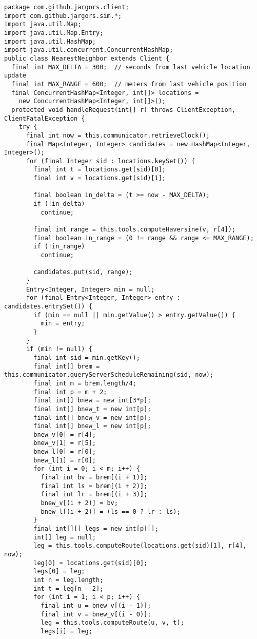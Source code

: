{
\small
\begin{verbatim}
package com.github.jargors.client;
import com.github.jargors.sim.*;
import java.util.Map;
import java.util.Map.Entry;
import java.util.HashMap;
import java.util.concurrent.ConcurrentHashMap;
public class NearestNeighbor extends Client {
  final int MAX_DELTA = 300;  // seconds from last vehicle location update
  final int MAX_RANGE = 600;  // meters from last vehicle position
  final ConcurrentHashMap<Integer, int[]> locations =
    new ConcurrentHashMap<Integer, int[]>();
  protected void handleRequest(int[] r) throws ClientException, ClientFatalException {
    try {
      final int now = this.communicator.retrieveClock();
      final Map<Integer, Integer> candidates = new HashMap<Integer, Integer>();
      for (final Integer sid : locations.keySet()) {
        final int t = locations.get(sid)[0];
        final int v = locations.get(sid)[1];

        final boolean in_delta = (t >= now - MAX_DELTA);
        if (!in_delta)
          continue;

        final int range = this.tools.computeHaversine(v, r[4]);
        final boolean in_range = (0 != range && range <= MAX_RANGE);
        if (!in_range)
          continue;

        candidates.put(sid, range);
      }
      Entry<Integer, Integer> min = null;
      for (final Entry<Integer, Integer> entry : candidates.entrySet()) {
        if (min == null || min.getValue() > entry.getValue()) {
          min = entry;
        }
      }
      if (min != null) {
        final int sid = min.getKey();
        final int[] brem = this.communicator.queryServerScheduleRemaining(sid, now);
        final int m = brem.length/4;
        final int p = m + 2;
        final int[] bnew = new int[3*p];
        final int[] bnew_t = new int[p];
        final int[] bnew_v = new int[p];
        final int[] bnew_l = new int[p];
        bnew_v[0] = r[4];
        bnew_v[1] = r[5];
        bnew_l[0] = r[0];
        bnew_l[1] = r[0];
        for (int i = 0; i < m; i++) {
          final int bv = brem[(i + 1)];
          final int ls = brem[(i + 2)];
          final int lr = brem[(i + 3)];
          bnew_v[(i + 2)] = bv;
          bnew_l[(i + 2)] = (ls == 0 ? lr : ls);
        }
        final int[][] legs = new int[p][];
        int[] leg = null;
        leg = this.tools.computeRoute(locations.get(sid)[1], r[4], now);
        leg[0] = locations.get(sid)[0];
        legs[0] = leg;
        int n = leg.length;
        int t = leg[n - 2];
        for (int i = 1; i < p; i++) {
          final int u = bnew_v[(i - 1)];
          final int v = bnew_v[(i - 0)];
          leg = this.tools.computeRoute(u, v, t);
          legs[i] = leg;


\end{verbatim}}
